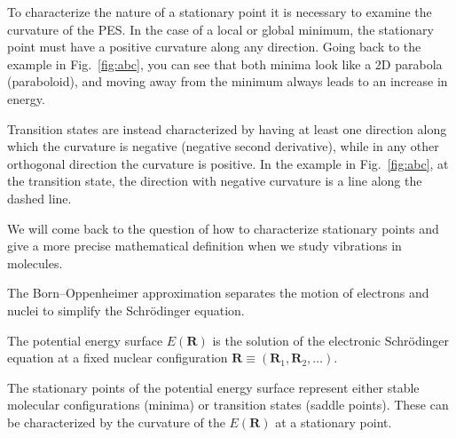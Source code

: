 \documentclass[../Main/chem371-notes.tex]{subfiles}
\begin{document}
To characterize the nature of a stationary point it is necessary to examine the curvature of the PES.
In the case of a local or global minimum, the stationary point must have a positive curvature along any direction.
Going back to the example in Fig.~\ref{fig:abc}, you can see that both minima look like a 2D parabola (paraboloid), and moving away from the minimum always leads to an increase in energy.

Transition states are instead characterized by having at least one direction along which the curvature is negative (negative second derivative), while in any other orthogonal direction the curvature is positive.
In the example in Fig.~\ref{fig:abc}, at the transition state, the direction with negative curvature is a line along the dashed line.

We will come back to the question of how to characterize stationary points and give a more precise mathematical definition when we study vibrations in molecules.

\begin{summary}
\item The Born--Oppenheimer approximation separates the motion of electrons and nuclei to simplify the Schr\"{o}dinger equation.
\item The potential energy surface $E(\mathbf{R})$ is the solution of the electronic Schr\"{o}dinger equation at a fixed nuclear configuration $ \mathbf{R} \equiv (\mathbf{R}_1,\mathbf{R}_2,\ldots)$.
\item The stationary points of the potential energy surface represent either stable molecular configurations (minima) or transition states (saddle points). These can be characterized by the curvature of the $E(\mathbf{R})$ at a stationary point.
\end{summary}
\end{document}
